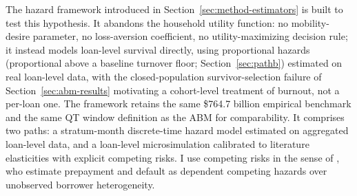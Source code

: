 \documentclass[12pt]{article}
\begin{document}
The hazard framework introduced in Section~\ref{sec:method-estimators} is built to test this hypothesis. It abandons the household utility function: no mobility-desire parameter, no loss-aversion coefficient, no utility-maximizing decision rule; it instead models loan-level survival directly, using proportional hazards (proportional above a baseline turnover floor; Section~\ref{sec:pathb}) estimated on real loan-level data, with the closed-population survivor-selection failure of Section~\ref{sec:abm-results} motivating a cohort-level treatment of burnout, not a per-loan one. The framework retains the same \$764.7 billion empirical benchmark and the same QT window definition as the ABM for comparability. It comprises two paths: a stratum-month discrete-time hazard model estimated on aggregated loan-level data, and a loan-level microsimulation calibrated to literature elasticities with explicit competing risks. I use competing risks in the sense of \citet{deng2000}, who estimate prepayment and default as dependent competing hazards over unobserved borrower heterogeneity.
\end{document}
